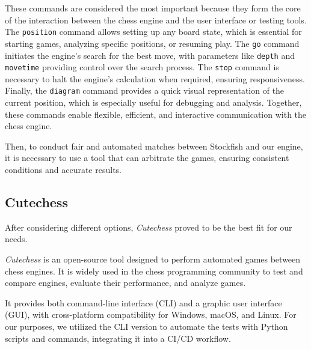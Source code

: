 \vspace{1em}

\noindent These commands are considered the most important because they form the core of the interaction between the chess engine and the user interface or testing tools. The \texttt{position} command allows setting up any board state, which is essential for starting games, analyzing specific positions, or resuming play. The \texttt{go} command initiates the engine's search for the best move, with parameters like \texttt{depth} and \texttt{movetime} providing control over the search process. The \texttt{stop} command is necessary to halt the engine's calculation when required, ensuring responsiveness. Finally, the \texttt{diagram} command provides a quick visual representation of the current position, which is especially useful for debugging and analysis. Together, these commands enable flexible, efficient, and interactive communication with the chess engine.

\vspace{1em}

\noindent Then, to conduct fair and automated matches between Stockfish and our engine, it is necessary to use a tool that can arbitrate the games, ensuring consistent conditions and accurate results.

\subsection{Cutechess}

\noindent After considering different options, \textit{Cutechess} proved to be the best fit for our needs.

\vspace{1em}

\noindent \textit{Cutechess} is an open-source tool designed to perform automated games between chess engines. It is widely used in the chess programming community to test and compare engines, evaluate their performance, and analyze games.

\vspace{1em}

\noindent It provides both command-line interface (CLI) and a graphic user interface (GUI), with cross-platform compatibility for Windows, macOS, and Linux. For our purposes, we utilized the CLI version to automate the tests with Python scripts and commands, integrating it into a CI/CD workflow.

\vspace{1em}

